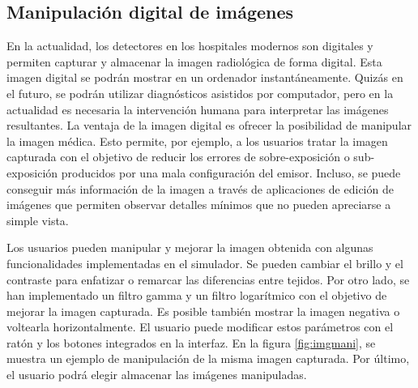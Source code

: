 \subsection{Manipulación digital de imágenes}
\label{xray:ajustes}

En la actualidad, los detectores en los hospitales modernos son digitales y permiten capturar y almacenar la imagen radiológica de forma digital. Esta imagen digital se podrán mostrar en un ordenador instantáneamente. Quizás en el futuro, se podrán utilizar diagnósticos asistidos por computador, pero en la actualidad es necesaria la intervención humana para interpretar las imágenes resultantes. La ventaja de la imagen digital es ofrecer la posibilidad de manipular la imagen médica. Esto permite, por ejemplo, a los usuarios tratar la imagen capturada con el objetivo de reducir los errores de sobre-exposición o sub-exposición producidos por una mala configuración del emisor. Incluso, se puede conseguir más información de la imagen a través de aplicaciones de edición de imágenes que permiten observar detalles mínimos que no pueden apreciarse a simple vista.  

Los usuarios pueden manipular y mejorar la imagen obtenida con algunas funcionalidades implementadas en el simulador. Se pueden cambiar el brillo y el contraste para enfatizar o remarcar las diferencias entre tejidos. Por otro lado, se han implementado un filtro gamma y un filtro logarítmico con el objetivo de mejorar la imagen capturada. Es posible también mostrar la imagen negativa o voltearla horizontalmente. El usuario puede modificar estos parámetros con el ratón y los botones integrados en la interfaz. En la figura \ref{fig:imgmani}, se muestra un ejemplo de manipulación de la misma imagen capturada. Por último, el usuario podrá elegir almacenar las imágenes manipuladas.%



